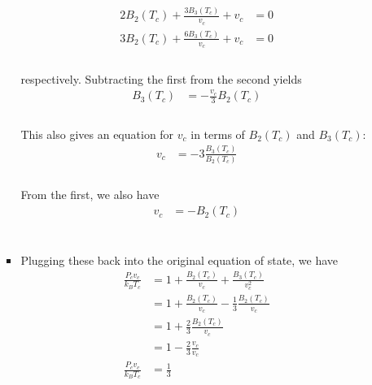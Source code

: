 \documentclass[]{article}
\begin{document}
\begin{enumerate}[1.]
\begin{enumerate}[i.]
\begin{itemize}
\begin{equation}
\begin{aligned}
2 B_2( T_c ) + \frac{ 3 B_3 ( T_c ) }{v_c} + v_c & = 0 \\
3 B_2( T_c ) + \frac{ 6 B_3 ( T_c ) }{v_c} + v_c & = 0 \\
\end{aligned}
\end{equation} \\

respectively. Subtracting the first from the second yields \\

\begin{equation}
\begin{aligned}
B_3 ( T_c ) & =  - \frac{ v_c }{3}  B_2( T_c )  \\
\end{aligned}
\end{equation} \\

This also gives an equation for $v_c$ in terms of $B_2(T_c)$ and $B_3(T_c)$: \\

\begin{equation}
\begin{aligned}
v_c  & =  - 3 \frac{ B_3 ( T_c ) }{ B_2( T_c )  } \\
\end{aligned}
\end{equation} \\

From the first, we also have \\

\begin{equation}
\begin{aligned}
v_c  & =  - B_2( T_c )\\
\end{aligned}
\end{equation} \\



\item Plugging these back into the original equation of state, we have \\

\begin{equation}
\begin{aligned}
\frac{  P_c v_c }{ k_B T_c } & =  1 + \frac{ B_2(T_c) }{v_c} + \frac{ B_3(T_c) }{ v_c^2 }  \\
%
& =  1 + \frac{ B_2(T_c) }{v_c} - \frac{1}{3} \frac{ B_2(T_c) }{ v_c }  \\
%
& =  1 + \frac{ 2 }{3 }\frac{ B_2(T_c) }{v_c} \\
%
& =  1 - \frac{ 2 }{3 }\frac{ v_c }{v_c} \\
%
\frac{  P_c v_c }{ k_B T_c } & =   \frac{ 1 }{3 } \\
%
\end{aligned}
\end{equation} \\


\end{itemize}
\end{enumerate}
\end{enumerate}
\end{document}
